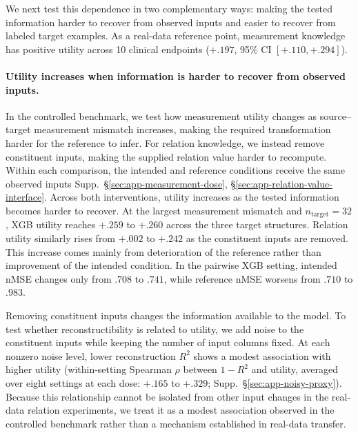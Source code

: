 \documentclass{article} %
\newcommand{\supp}[1]{\textnormal{Supp.~#1}}
\begin{document}
We next test this dependence in two complementary ways: making the tested information harder to recover from observed inputs and easier to recover from labeled target examples.
As a real-data reference point, measurement knowledge has positive utility across 10 clinical endpoints ($+.197$, 95\% CI $[+.110,+.294]$).

\paragraph{Utility increases when information is harder to recover from observed inputs.}

In the controlled benchmark, we test how measurement utility changes as source--target measurement mismatch increases, making the required transformation harder for the reference to infer.
For relation knowledge, we instead remove constituent inputs, making the supplied relation value harder to recompute.
Within each comparison, the intended and reference conditions receive the same observed inputs \supp{\S\ref{sec:app-measurement-dose}, \S\ref{sec:app-relation-value-interface}}.
Across both interventions, utility increases as the tested information becomes harder to recover.
At the largest measurement mismatch and $n_{\mathrm{target}}=32$, XGB utility reaches $+.259$ to $+.260$ across the three target structures.
Relation utility similarly rises from $+.002$ to $+.242$ as the constituent inputs are removed.
This increase comes mainly from deterioration of the reference rather than improvement of the intended condition.
In the pairwise XGB setting, intended nMSE changes only from $.708$ to $.741$, while reference nMSE worsens from $.710$ to $.983$.

Removing constituent inputs changes the information available to the model. To test whether reconstructibility is related to utility, we add noise to the constituent inputs while keeping the number of input columns fixed.
At each nonzero noise level, lower reconstruction $R^2$ shows a modest association with higher utility (within-setting Spearman $\rho$ between $1-R^2$ and utility, averaged over eight settings at each dose: $+.165$ to $+.329$; \supp{\S\ref{sec:app-noisy-proxy}}).
Because this relationship cannot be isolated from other input changes in the real-data relation experiments, we treat it as a modest association observed in the controlled benchmark rather than a mechanism established in real-data transfer.
\end{document}
